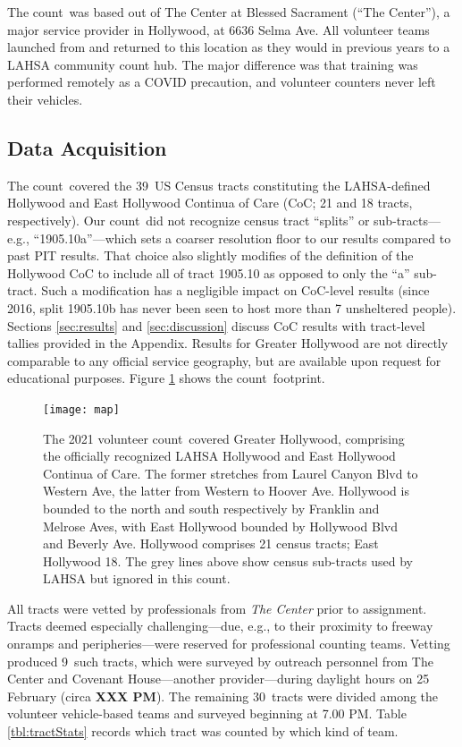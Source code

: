 \documentclass[11pt,twocolumn]{article}
\def\bfr{\bf\color{red}}
\def\Count{count}
\def\ntracts{39}
\def\nprof{9}
\def\nvol{30}
\def\resp{respectively}
\begin{document}
The \Count\ was based out of The Center at Blessed Sacrament (``The Center''), a major service 
provider in Hollywood, at 6636 Selma Ave. All volunteer teams launched from and returned to this 
location as they would in previous years to a LAHSA community count hub. The major difference 
was that training was performed remotely as a COVID precaution, and volunteer counters never left 
their vehicles.

\subsection{Data Acquisition}
\label{sec:acquisition}

The \Count\ covered the \ntracts\ US Census tracts constituting the LAHSA-defined Hollywood 
and East Hollywood Continua of Care (CoC; 21 and 18 tracts, \resp). Our \Count\ did not recognize census 
tract ``splits'' or sub-tracts---e.g., ``1905.10a''---which sets a coarser resolution floor to our results 
compared to past PIT results. That choice also slightly modifies of the definition of the Hollywood CoC 
to include all of tract 1905.10 as opposed to only the ``a'' sub-tract. Such a modification has a negligible 
impact on CoC-level results (since 2016, split 1905.10b has never been seen to host more than 7 unsheltered 
people). Sections \ref{sec:results} and \ref{sec:discussion} discuss CoC results with tract-level tallies provided
in the Appendix. Results for Greater Hollywood are not directly comparable to any official service 
geography, but are available upon request for educational purposes. Figure \ref{fig:map} shows 
the \Count\ footprint.

\begin{figure}
	\centering
	\texttt{[image: map]}
	\caption{The 2021 volunteer \Count\ covered Greater Hollywood, comprising the 
			officially recognized LAHSA Hollywood and East Hollywood Continua
			of Care. The former stretches from Laurel Canyon Blvd to Western Ave,
			the latter from Western to Hoover Ave. Hollywood is bounded to the north
			and south respectively by Franklin	and Melrose Aves, with East Hollywood
			bounded by Hollywood Blvd and Beverly Ave. Hollywood comprises
			21 census tracts; East Hollywood 18. The grey lines above show census 
			sub-tracts used by LAHSA but ignored in this \Count.}
	\label{fig:map}	
\end{figure}

All tracts were vetted by professionals from {\it The Center} prior to assignment. Tracts deemed 
especially challenging---due, e.g., to their proximity to freeway onramps and peripheries---were 
reserved for professional counting teams. Vetting produced \nprof\ such tracts, which were surveyed 
by outreach personnel from The Center and Covenant House---another provider---during daylight hours on 25 
February (circa {\bfr XXX PM}). The remaining \nvol\ tracts were divided among the volunteer 
vehicle-based teams and surveyed beginning at 7.00 PM. Table \ref{tbl:tractStats} records which tract
was counted by which kind of team.
\end{document}
